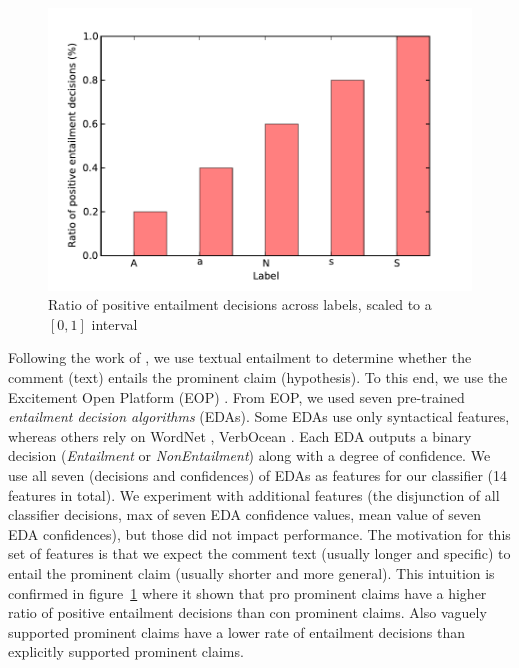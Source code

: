 \begin{figure}
\includegraphics{entailment.pdf}
\caption{Ratio of positive entailment decisions across labels, scaled to a $[0,1]$ interval
}
\label{fig:entailment_ratio}
\end{figure}

Following the work of \citet{cabrio2012combining}, we use textual 
entailment to determine whether the comment (text) entails the prominent
claim (hypothesis). 
To this end, we use the Excitement Open Platform (EOP) \citep{pado2015design}. 
From EOP, we used seven pre-trained \textit{entailment decision algorithms}
(EDAs). 
Some EDAs use only syntactical features, whereas others rely on
WordNet \citep{miller1995wordnet}, VerbOcean \citep{chklovski2004verbocean}. 
Each EDA outputs a binary decision (\textit{Entailment} or \textit{NonEntailment})
along with a degree of confidence. 
We use all seven (decisions and confidences) of EDAs as features for our classifier 
(14 features in total). 
We experiment with additional features (the disjunction of all classifier decisions, 
max of seven EDA confidence values, mean value of seven EDA confidences), but those
did not impact performance. 
The motivation for this set of features is that we expect the comment text
(usually longer and specific) to entail the prominent claim (usually shorter
and more general).
This intuition is confirmed in figure~\ref{fig:entailment_ratio}
where it shown that 
pro prominent claims have a higher ratio of positive entailment decisions than
con prominent claims.
Also vaguely supported prominent claims have a lower rate of entailment
decisions than explicitly supported prominent claims. 

